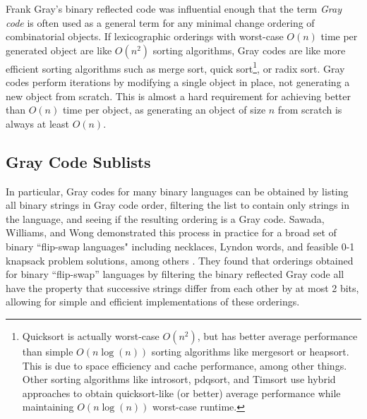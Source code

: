 Frank Gray's binary reflected code was influential enough that the term \emph{Gray code} is often used as a general term for any minimal change ordering of combinatorial objects.  If lexicographic orderings with worst-case $O(n)$ time per generated object are like $O(n^2)$ sorting algorithms, Gray codes are like more efficient sorting algorithms such as merge sort, quick sort\footnote{Quicksort is actually worst-case $O(n^2)$, but has better average performance than simple $O(n \log(n))$ sorting algorithms like mergesort or heapsort.  This is due to space efficiency and cache performance, among other things.  Other sorting algorithms like introsort, pdqsort, and Timsort use hybrid approaches to obtain quicksort-like (or better) average performance while maintaining $O(n \log(n))$ worst-case runtime.}, or radix sort.  Gray codes perform iterations by modifying a single object in place, not generating a new object from scratch.  This is almost a hard requirement for achieving better than $O(n)$ time per object, as generating an object of size $n$ from scratch is always at least $O(n)$.


\subsection{Gray Code Sublists} \label{sec:GraySublists}
In particular, Gray codes for many binary languages can be obtained by listing all binary strings in Gray code order, filtering the list to contain only strings in the language, and seeing if the resulting ordering is a Gray code.  Sawada, Williams, and Wong demonstrated this process in practice for a broad set of binary ``flip-swap languages" including necklaces, Lyndon words, and feasible 0-1 knapsack problem solutions, among others \cite{sawada2021inside}.  They found that orderings obtained for binary ``flip-swap'' languages by filtering the binary reflected Gray code all have the property that successive strings differ from each other by at most 2 bits, allowing for simple and efficient implementations of these orderings.


